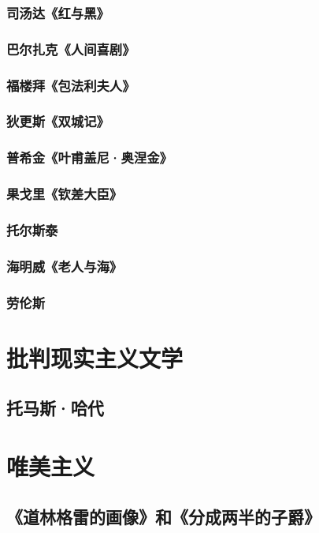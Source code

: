 \documentclass[UTF8]{../../RepresentationUniverse}
\begin{document}
\subsubsection{司汤达《红与黑》}
\subsubsection{巴尔扎克《人间喜剧》}
\subsubsection{福楼拜《包法利夫人》}
\subsubsection{狄更斯《双城记》}
\subsubsection{普希金《叶甫盖尼·奥涅金》}
\subsubsection{果戈里《钦差大臣》}
\subsubsection{托尔斯泰}
\subsubsection{海明威《老人与海》}
\subsubsection{劳伦斯}



\section{批判现实主义文学}

\subsection{托马斯·哈代}


\section{唯美主义}

\subsection{《道林格雷的画像》和《分成两半的子爵》}
\end{document}
